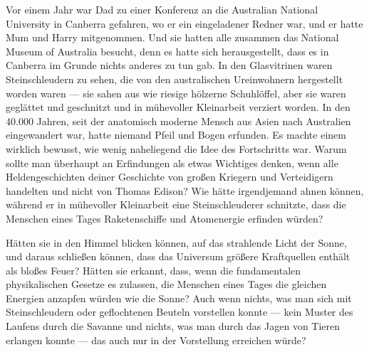 Vor einem Jahr war Dad zu einer Konferenz an die Australian National University in Canberra gefahren, wo er ein eingeladener Redner war, und er hatte Mum und Harry mitgenommen. Und sie hatten alle zusammen das National Museum of Australia besucht, denn es hatte sich herausgestellt, dass es in Canberra im Grunde nichts anderes zu tun gab. In den Glasvitrinen waren Steinschleudern zu sehen, die von den australischen Ureinwohnern hergestellt worden waren — sie sahen aus wie riesige hölzerne Schuhlöffel, aber sie waren geglättet und geschnitzt und in mühevoller Kleinarbeit verziert worden. In den 40.000 Jahren, seit der anatomisch moderne Mensch aus Asien nach Australien eingewandert war, hatte niemand Pfeil und Bogen erfunden. Es machte einem wirklich bewusst, wie wenig naheliegend die Idee des Fortschritts war. Warum sollte man überhaupt an Erfindungen als etwas Wichtiges denken, wenn alle Heldengeschichten deiner Geschichte von großen Kriegern und Verteidigern handelten und nicht von Thomas Edison? Wie hätte irgendjemand ahnen können, während er in mühevoller Kleinarbeit eine Steinschleuderer schnitzte, dass die Menschen eines Tages Raketenschiffe und Atomenergie erfinden würden?

Hätten sie in den Himmel blicken können, auf das strahlende Licht der Sonne, und daraus schließen können, dass das Universum größere Kraftquellen enthält als bloßes Feuer? Hätten sie erkannt, dass, wenn die fundamentalen physikalischen Gesetze es zulassen, die Menschen eines Tages die gleichen Energien anzapfen würden wie die Sonne? Auch wenn nichts, was man sich mit Steinschleudern oder geflochtenen Beuteln vorstellen konnte — kein Muster des Laufens durch die Savanne und nichts, was man durch das Jagen von Tieren erlangen konnte — das auch nur in der Vorstellung erreichen würde?

